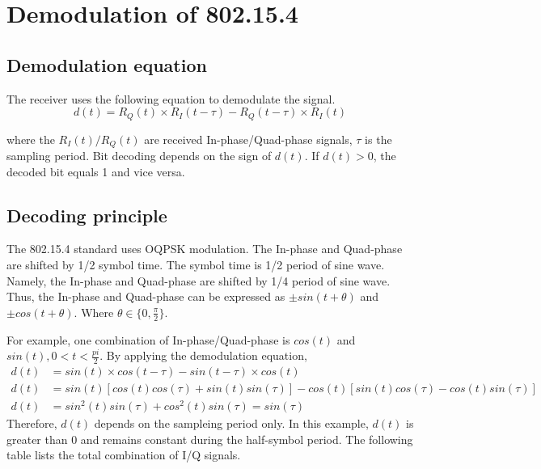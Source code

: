 \chapter{Demodulation of 802.15.4}
\section{Demodulation equation}
The receiver uses the following equation to demodulate the signal.
\begin{equation}
d(t) = R_Q(t)\times R_I(t-\tau) - R_Q(t-\tau)\times R_I(t)
\end{equation}

where the $R_I(t)/R_Q(t)$ are received In-phase/Quad-phase signals, $\tau$ is the sampling period. Bit decoding depends on
the sign of $d(t)$. If $d(t)>0$, the decoded bit equals 1 and vice versa.

\section{Decoding principle}
The 802.15.4 standard uses OQPSK modulation. The In-phase and Quad-phase are shifted by 1/2 symbol time. The symbol time 
is 1/2 period of sine wave. Namely, the In-phase and Quad-phase are shifted by 1/4 period of sine wave. Thus, the In-phase
and Quad-phase can be expressed as $\pm sin(t + \theta)$ and $\pm cos(t + \theta)$. Where $\theta \in \{0, \tfrac{\pi}{2}\}$.

For example, one combination of In-phase/Quad-phase is $cos(t)$ and $sin(t), 0<t<\tfrac{pi}{2}$. By applying the demodulation
equation,
\begin{align}
d(t)&= sin(t)\times cos(t-\tau) - sin(t-\tau)\times cos(t) \\
d(t)&= sin(t)\left[cos(t)cos(\tau) + sin(t)sin(\tau)\right] - cos(t)\left[sin(t)cos(\tau) - cos(t)sin(\tau)\right] \\
d(t)&= sin^2(t)sin(\tau) + cos^2(t)sin(\tau) = sin(\tau)
\end{align}
Therefore, $d(t)$ depends on the sampleing period only. In this example, $d(t)$ is greater than 0 and remains constant 
during the half-symbol period. The following table lists the total combination of I/Q signals.

